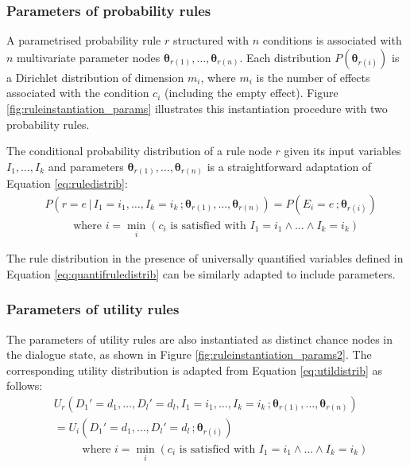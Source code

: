 \subsubsection*{Parameters of probability rules}

A parametrised probability rule $r$ structured with $n$ conditions is associated with $n$ multivariate parameter nodes $\boldsymbol\theta_{r(1)}, \dots, \boldsymbol\theta_{r(n)}$.  Each distribution $P(\boldsymbol\theta_{r(i)})$ is a Dirichlet distribution of dimension $m_i$, where $m_i$ is the number of effects associated with the condition $c_i$ (including the empty effect). Figure \ref{fig:ruleinstantiation_params} illustrates this instantiation procedure with two probability rules.  

The conditional probability distribution of a rule node $r$ given its input variables $I_1, \dots, I_k$ and parameters $\boldsymbol\theta_{r(1)}, \dots, \boldsymbol\theta_{r(n)}$ is a straightforward adaptation of Equation \eqref{eq:ruledistrib}:
\begin{align}
& P(r\!=\!e \, | \, I_1\!=\!i_1, \dots,  I_k\!=\!i_k\,; \boldsymbol\theta_{r(1)}, \dots, \boldsymbol\theta_{r(n)})  = P(E_i = e\,; \boldsymbol\theta_{r(i)}) \\
& \; \; \; \; \; \; \; \; \text{ where } i = \min_i (c_i \text{ is satisfied with } I_1\!=\!i_1 \land \dots \land I_k\!=\!i_k) \nonumber
\end{align}

The rule distribution in the presence of universally quantified variables defined in Equation \eqref{eq:quantifruledistrib} can be similarly adapted to include parameters.

\subsubsection*{Parameters of utility rules}

The parameters of utility rules are also instantiated as distinct chance nodes in the dialogue state, as shown in Figure \ref{fig:ruleinstantiation_params2}. The corresponding utility distribution is adapted from Equation \eqref{eq:utildistrib} as follows:
\begin{align}
& U_r(D_1'\!=\!d_1, \dots, D_l'\!=\!d_l, I_1\!=\!i_1, \dots, I_k\!=\!i_k\,; \boldsymbol\theta_{r(1)}, \dots, \boldsymbol\theta_{r(n)}) \nonumber \\ 
& = U_i(D_1'\!=\!d_1, \dots, D_l'\!=\!d_l\,; \boldsymbol\theta_{r(i)})  \label{eq:utildistrib_params}\\
& \; \; \; \; \; \; \; \; \text{ where } i = \min_i (c_i \text{ is satisfied with } I_1\!=\!i_1 \land \dots \land I_k\!=\!i_k) \nonumber
\end{align}

